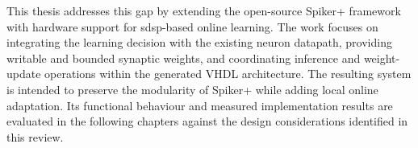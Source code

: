 This thesis addresses this gap by extending the open-source Spiker+ framework with hardware support for \gls{sdsp}-based online learning. The work focuses on integrating the learning decision with the existing neuron datapath, providing writable and bounded synaptic weights, and coordinating inference and weight-update operations within the generated VHDL architecture. The resulting system is intended to preserve the modularity of Spiker+ while adding local online adaptation. Its functional behaviour and measured implementation results are evaluated in the following chapters against the design considerations identified in this review.
